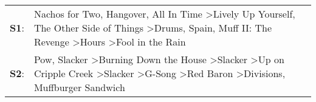 \begin{supertabular}{p{0.03\textwidth}p{0.92\textwidth}}
 \textbf{S1}:  &                    Nachos for Two\textsuperscript{}, \enspace Hangover\textsuperscript{}, \enspace All In Time\textsuperscript{} \textgreater \enspace Lively Up Yourself\textsuperscript{}, \enspace The Other Side of Things\textsuperscript{} \textgreater \enspace Drums\textsuperscript{}, \enspace Spain\textsuperscript{}, \enspace Muff II: The Revenge\textsuperscript{} \textgreater \enspace Hours\textsuperscript{} \textgreater \enspace Fool in the Rain\textsuperscript{}  \enspace  \\
 \textbf{S2}:  &  Pow\textsuperscript{}, \enspace Slacker\textsuperscript{} \textgreater \enspace Burning Down the House\textsuperscript{} \textgreater \enspace Slacker\textsuperscript{} \textgreater \enspace Up on Cripple Creek\textsuperscript{} \textgreater \enspace Slacker\textsuperscript{} \textgreater \enspace G-Song\textsuperscript{} \textgreater \enspace Red Baron\textsuperscript{} \textgreater \enspace Divisions\textsuperscript{}, \enspace Muffburger Sandwich\textsuperscript{}  \enspace  \\
\end{supertabular}
